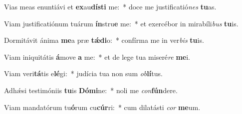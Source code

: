 \item Vias meas enuntiávi et \textbf{ex}au\textbf{dís}\textbf{ti} me:~* doce me justificatió\textit{nes} \textbf{tu}as.
\item Viam justificatiónum tuárum \textbf{ín}stru\textbf{e} me:~* et exercébor in mirabíli\textit{bus} \textbf{tu}is.
\item Dormitávit ánima \textbf{me}a præ \textbf{tǽ}\textbf{di}o:~* confírma me in ver\textit{bis} \textbf{tu}is.
\item Viam iniquitátis \textbf{á}move \textbf{a} me:~* et de lege tua miseré\textit{re} \textbf{me}i.
\item Viam veri\textbf{tá}tis e\textbf{lé}gi:~* judícia tua non sum \textit{ob}\textbf{lí}tus.
\item Adhǽsi testimóniis \textbf{tu}is \textbf{Dó}\textbf{mi}ne:~* noli me \textit{con}\textbf{fún}dere.
\item Viam mandatórum tu\textbf{ó}rum cu\textbf{cúr}ri:~* cum dilatásti \textit{cor} \textbf{me}um.
